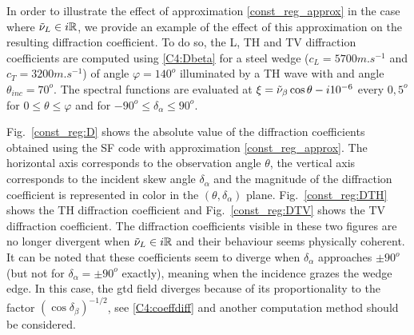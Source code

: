 In order to illustrate the effect of approximation \eqref{const_reg_approx} in the case where $\tilde{\nu}_L \in i\mathbb{R}$, we provide an example of the effect of this approximation on the resulting diffraction coefficient. To do so, the L, TH and TV diffraction coefficients are computed using \eqref{C4:Dbeta} for a steel wedge ($c_L=5700m.s^{-1}$ and $c_T=3200m.s^{-1}$) of angle $\varphi=140^o$ illuminated by a TH wave with and angle $\theta_{inc}=70^o$. The spectral functions are evaluated at $\xi=\tilde{\nu}_{\beta}\cos\theta -i10^{-6}$ every $0,5^o$ for $0\leq\theta\leq \varphi$ and for $-90^o\leq \delta_{\alpha} \leq 90^o$.

Fig.~\ref{const_reg:D} shows the absolute value of the diffraction coefficients obtained using the SF code with approximation \eqref{const_reg_approx}. The horizontal axis corresponds to the observation angle $\theta$, the vertical axis corresponds to the incident skew angle $\delta_{\alpha}$ and the magnitude of the diffraction coefficient is represented in color in the $(\theta,\delta_{\alpha})$ plane. Fig.~\ref{const_reg:DTH} shows the TH diffraction coefficient and Fig.~\ref{const_reg:DTV} shows the TV diffraction coefficient. The diffraction coefficients visible in these two figures are no longer divergent when $\tilde{\nu}_L \in i\mathbb{R}$ and their behaviour seems physically coherent. It can be noted that these coefficients seem to diverge when $\delta_{\alpha}$ approaches $\pm90^o$ (but not for $\delta_{\alpha}=\pm90^o$ exactly), meaning when the incidence grazes the wedge edge. In this case, the \acrshort{gtd} field diverges because of its proportionality to the factor $(\cos\delta_{\beta})^{-1/2}$, see \eqref{C4:coeffdiff} and another computation method should be considered.

